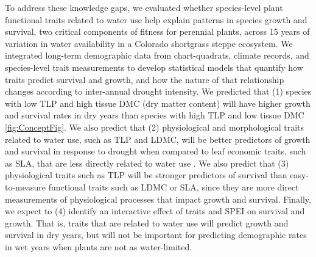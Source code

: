 \documentclass[12pt, letterpaper]{article}
\begin{document}
To address these knowledge gaps, we evaluated whether species-level plant functional traits related to water use help explain patterns in species growth and survival, two critical components of fitness for perennial plants, across 15 years of variation in water availability  in a Colorado shortgrass steppe ecosystem. We integrated long-term demographic data from chart-quadrats, climate records, and species-level trait measurements to develop statistical models that quantify how traits predict survival and growth, and how the nature of that relationship changes according to inter-annual drought intensity. We predicted that (1) species with low TLP and high tissue DMC (dry matter content) will have higher growth and survival rates in dry years than species with high TLP and low tissue DMC \ref{fig:ConceptFig}. We also predict that (2) physiological and morphological traits related to water use, such as TLP and LDMC, will be better predictors of growth and survival in response to drought when compared to leaf economic traits, such as SLA, that are less directly related to water use \citep{Wright2004, Reich2014}. We also predict that (3) physiological traits such as TLP will be stronger predictors of survival than easy-to-measure functional traits such as LDMC or SLA, since they are more direct measurements of physiological processes that impact growth and survival. Finally, we expect to (4) identify an interactive effect of traits and SPEI on survival and growth. That is, traits that are related to water use will predict growth and survival in dry years, but will not be important for predicting demographic rates in wet years when plants are not as water-limited.
\end{document}

